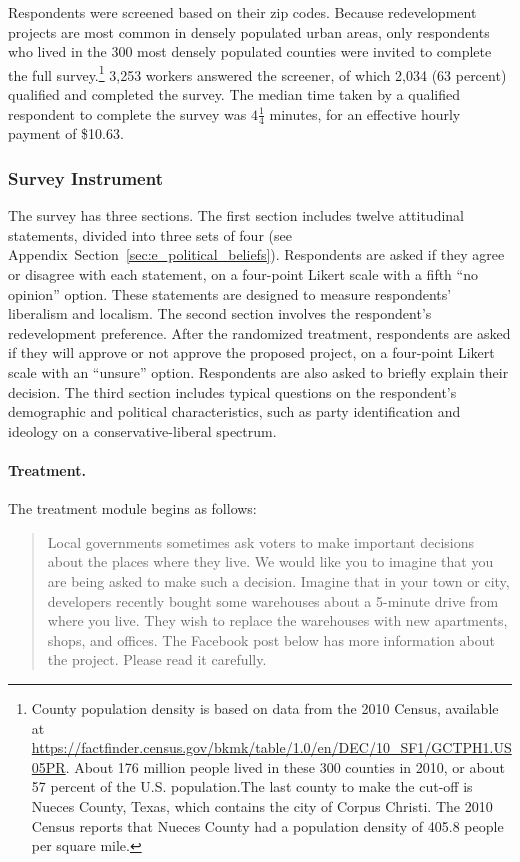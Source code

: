 \documentclass[article,11pt]{memoir}
\begin{document}
Respondents were screened based on their zip codes.  Because redevelopment projects are most common in densely populated urban areas, only respondents who lived in the 300 most densely populated counties were invited to complete the full survey.\footnote{County population density is based on data from the 2010 Census, available at \url{https://factfinder.census.gov/bkmk/table/1.0/en/DEC/10_SF1/GCTPH1.US05PR}. About 176 million people lived in these 300 counties in 2010, or about 57 percent of the U.S. population.The last county to make the cut-off is Nueces County, Texas, which contains the city of Corpus Christi. The 2010 Census reports that Nueces County had a population density of 405.8 people per square mile.} 3,253 workers answered the screener, of which 2,034 (63 percent) qualified and completed the survey.  The median time taken by a qualified respondent to complete the survey was $4 \frac 14$ minutes, for an effective hourly payment of \$10.63.

\subsubsection{Survey Instrument}

The survey has three sections.  The first section includes twelve attitudinal statements, divided into three sets of four (see Appendix~Section~\ref{sec:e_political_beliefs}).  Respondents are asked if they agree or disagree with each statement, on a four-point Likert scale with a fifth ``no opinion'' option.  These statements are designed to measure respondents' liberalism and localism.  The second section involves the respondent's redevelopment preference.  After the randomized treatment, respondents are asked if they will approve or not approve the proposed project, on a four-point Likert scale with an ``unsure'' option.  Respondents are also asked to briefly explain their decision.  The third section includes typical questions on the respondent's demographic and political characteristics, such as party identification and ideology on a conservative-liberal spectrum.

\paragraph{Treatment.} The treatment module begins as follows:

\begin{quote}
Local governments sometimes ask voters to make important decisions about the places where they live. We would like you to imagine that you are being asked to make such a decision.  Imagine that in your town or city, developers recently bought some warehouses about a 5-minute drive from where you live. They wish to replace the warehouses with new apartments, shops, and offices. The Facebook post below has more information about the project. Please read it carefully.
\end{quote}
\end{document}
